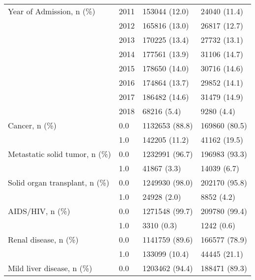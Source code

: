 \begin{tabular}{llll}
Year of Admission, n (\%) & 2011 &                  153044 (12.0) &       24040 (11.4) \\
                                       & 2012 &                  165816 (13.0) &       26817 (12.7) \\
                                       & 2013 &                  170225 (13.4) &       27732 (13.1) \\
                                       & 2014 &                  177561 (13.9) &       31106 (14.7) \\
                                       & 2015 &                  178650 (14.0) &       30716 (14.6) \\
                                       & 2016 &                  174864 (13.7) &       29852 (14.1) \\
                                       & 2017 &                  186482 (14.6) &       31479 (14.9) \\
                                       & 2018 &                    68216 (5.4) &         9280 (4.4) \\
Cancer, n (\%) & 0.0 &                 1132653 (88.8) &      169860 (80.5) \\
                                       & 1.0 &                  142205 (11.2) &       41162 (19.5) \\
Metastatic solid tumor, n (\%) & 0.0 &                 1232991 (96.7) &      196983 (93.3) \\
                                       & 1.0 &                    41867 (3.3) &        14039 (6.7) \\
Solid organ transplant, n (\%) & 0.0 &                 1249930 (98.0) &      202170 (95.8) \\
                                       & 1.0 &                    24928 (2.0) &         8852 (4.2) \\
AIDS/HIV, n (\%) & 0.0 &                 1271548 (99.7) &      209780 (99.4) \\
                                       & 1.0 &                     3310 (0.3) &         1242 (0.6) \\
Renal disease, n (\%) & 0.0 &                 1141759 (89.6) &      166577 (78.9) \\
                                       & 1.0 &                  133099 (10.4) &       44445 (21.1) \\
Mild liver disease, n (\%) & 0.0 &                 1203462 (94.4) &      188471 (89.3) \\

\end{tabular}
